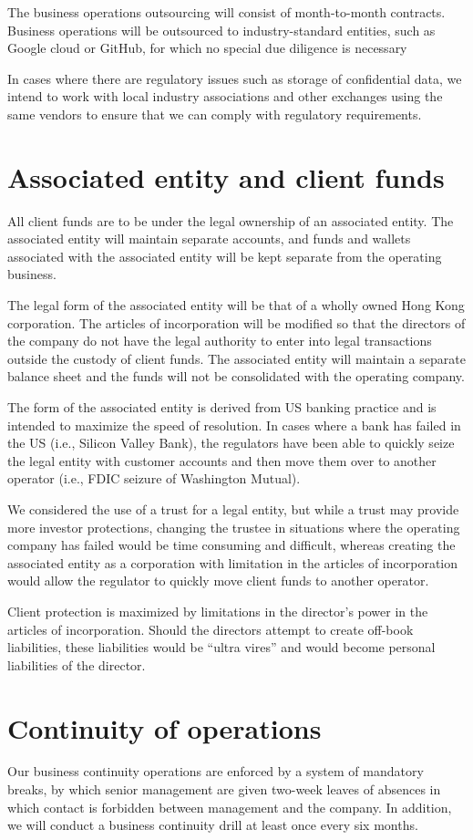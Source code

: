 The business operations outsourcing will consist of month-to-month
contracts.  Business operations will be outsourced to industry-standard entities, such as Google cloud or GitHub, for which no special due diligence is necessary

In cases where there are regulatory issues such as storage of
confidential data, we intend to work with local industry
associations and other exchanges using the same vendors to ensure that
we can comply with regulatory requirements.

\section{Associated entity and client funds}
All client funds are to be under the legal ownership of an associated
entity.  The associated entity will maintain separate accounts, and
funds and wallets associated with the associated entity will be kept
separate from the operating business.

The legal form of the associated entity will be that of a wholly owned
Hong Kong corporation.  The articles of incorporation will be modified
so that the directors of the company do not have the legal authority
to enter into legal transactions outside the custody of client
funds.  The associated entity will maintain a separate balance sheet
and the funds will not be consolidated with the operating company.

The form of the associated entity is derived from US banking practice
and is intended to maximize the speed of resolution.  In cases where a
bank has failed in the US (i.e., Silicon Valley Bank), the regulators
have been able to quickly seize the legal entity with customer
accounts and then move them over to another operator (i.e., FDIC
seizure of Washington Mutual).

We considered the use of a trust for a legal entity, but while a trust
may provide more investor protections, changing the trustee in
situations where the operating company has failed would be time
consuming and difficult, whereas creating the associated entity as a
corporation with limitation in the articles of incorporation would
allow the regulator to quickly move client funds to another operator.

Client protection is maximized by limitations in the director's power
in the articles of incorporation.  Should the directors attempt to
create off-book liabilities, these liabilities would be ``ultra
vires'' and would become personal liabilities of the director.

\section{Continuity of operations}
Our business continuity operations are enforced by a system of
mandatory breaks, by which senior management are given two-week leaves
of absences in which contact is forbidden between management and the
company.  In addition, we will conduct a business continuity drill at
least once every six months.

